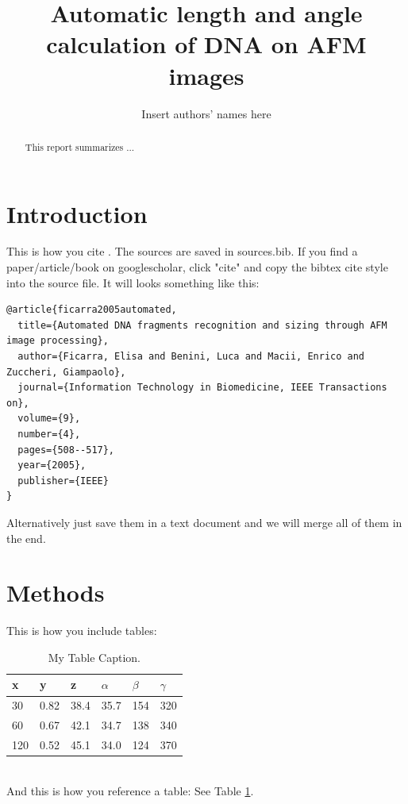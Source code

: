 \documentclass{article}
\begin{document}
%
\pagestyle{headings}  %
%
%

%

\title{Automatic length and angle calculation of DNA on AFM images}

\author{Insert authors' names here}

\maketitle  
\newpage
\tableofcontents
\newpage
%
\begin{abstract}
This report summarizes ...

\end{abstract}

\section{Introduction}
This is how you cite \cite{ficarra2005automated}.
The sources are saved in sources.bib. If you find a paper/article/book on googlescholar, click "cite" and copy the bibtex cite style into the source file. It will looks something like this:
\begin{verbatim}
@article{ficarra2005automated,
  title={Automated DNA fragments recognition and sizing through AFM image processing},
  author={Ficarra, Elisa and Benini, Luca and Macii, Enrico and Zuccheri, Giampaolo},
  journal={Information Technology in Biomedicine, IEEE Transactions on},
  volume={9},
  number={4},
  pages={508--517},
  year={2005},
  publisher={IEEE}
}
\end{verbatim}
Alternatively just save them in a text document and we will merge all of them in the end. 


\section{Methods}
This is how you include tables:
\begin{table}[htb]
\begin{center}
\caption{My Table Caption.}
\label{tab: example} %
\begin{tabular}{|l|l|l|l|l|l|}
\hline
x & y & z & $\alpha$
& $\beta$
& $\gamma$\\\hline
30 & 0.82 & 38.4 & 35.7 & 154 & 320 \\
60 & 0.67 & 42.1 & 34.7 & 138 & 340 \\
120 & 0.52 & 45.1 & 34.0 & 124 & 370 \\
\hline
\end{tabular}
\end{center}
\end{table}\\
And this is how you reference a table: See Table \ref{tab: example}.\\
\newpage
\end{document}
